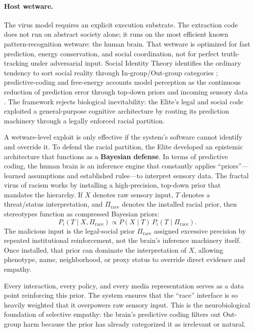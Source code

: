 \paragraph{Host wetware.}
The virus model requires an explicit execution substrate. The extraction code does not run on abstract society alone; it runs on the most efficient known pattern-recognition wetware: the human brain. That wetware is optimized for fast prediction, energy conservation, and social coordination, not for perfect truth-tracking under adversarial input. Social Identity Theory identifies the ordinary tendency to sort social reality through In-group/Out-group categories \cite{tajfel_turner_intergroup_conflict_1979}; predictive-coding and free-energy accounts model perception as the continuous reduction of prediction error through top-down priors and incoming sensory data \cite{friston_free_energy_2010,clark_whatever_next_2013}. The framework rejects biological inevitability: the Elite's legal and social code exploited a general-purpose cognitive architecture by routing its prediction machinery through a legally enforced racial partition.

A wetware-level exploit is only effective if the system's software cannot identify and override it. To defend the racial partition, the Elite developed an epistemic architecture that functions as a \textbf{Bayesian defense}. In terms of predictive coding, the human brain is an inference engine that constantly applies ``priors''---learned assumptions and established rules---to interpret sensory data. The fractal virus of racism works by installing a high-precision, top-down prior that mandates the hierarchy. If $X$ denotes raw sensory input, $T$ denotes a threat/status interpretation, and $\Pi_{\text{race}}$ denotes the installed racial prior, then stereotypes function as compressed Bayesian priors:
\[
P_i(T \mid X, \Pi_{\text{race}}) \propto P(X \mid T)\,P_i(T \mid \Pi_{\text{race}}).
\]
The malicious input is the legal-social prior $\Pi_{\text{race}}$ assigned excessive precision by repeated institutional reinforcement, not the brain's inference machinery itself. Once installed, that prior can dominate the interpretation of $X$, allowing phenotype, name, neighborhood, or proxy status to override direct evidence and empathy.

Every interaction, every policy, and every media representation serves as a data point reinforcing this prior. The system ensures that the ``race'' interface is so heavily weighted that it overpowers raw sensory input. This is the neurobiological foundation of selective empathy: the brain's predictive coding filters out Out-group harm because the prior has already categorized it as irrelevant or natural. 

